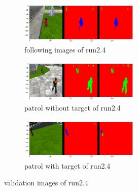 \documentclass[paper=a4, fontsize=11pt]{scrartcl} %
\numberwithin{equation}{section} %
\numberwithin{figure}{section} %
\numberwithin{table}{section} %
\begin{document}
 \begin{figure}[ht]
	 \begin{subfigure}{0.33\textwidth}
	 \includegraphics[width=0.9\linewidth, height=2cm]{./imgs/following_images24.png} 
	 \caption{following images of run2.4}
	 \label{fig:subfollowing_images24}
	 \end{subfigure}
	 \begin{subfigure}{0.33\textwidth}
	 \includegraphics[width=0.9\linewidth, height=2cm]{./imgs/patrol_non_targ24.png}
	 \caption{patrol without target of run2.4}
	 \label{fig:subpatrol_non_targ24}
	 \end{subfigure}
	 \begin{subfigure}{0.33\textwidth}
	 \includegraphics[width=0.9\linewidth, height=2cm]{./imgs/patrol_with_targ24.png}
	 \caption{patrol with target of run2.4}
	 \label{fig:subpatrol_with_targ24}
	 \end{subfigure}
 
	 \caption{validation images of run2.4}
	 \label{fig:outputimages24}
 \end{figure}
\end{document}
